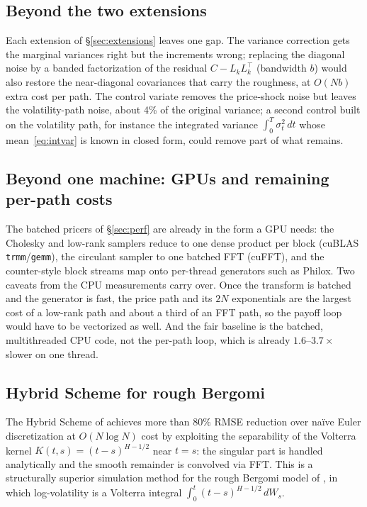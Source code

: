 \subsection{Beyond the two extensions}
\label{sec:ext-future}

Each extension of §\ref{sec:extensions} leaves one gap.  The variance correction gets
the marginal variances right but the increments wrong; replacing the diagonal noise by
a banded factorization of the residual $C - L_k L_k^\top$ (bandwidth $b$) would also
restore the near-diagonal covariances that carry the roughness, at $O(Nb)$ extra cost
per path.  The control variate removes the price-shock noise but leaves the
volatility-path noise, about 4\% of the original variance; a second control built on
the volatility path, for instance the integrated variance $\int_0^T \sigma_t^2\,dt$ whose
mean~\eqref{eq:intvar} is known in closed form, could remove part of what remains.

\subsection{Beyond one machine: GPUs and remaining per-path costs}
\label{sec:gpu-future}

The batched pricers of §\ref{sec:perf} are already in the form a GPU needs: the
Cholesky and low-rank samplers reduce to one dense product per block (cuBLAS
\texttt{trmm}/\texttt{gemm}), the circulant sampler to one batched FFT (cuFFT), and the
counter-style block streams map onto per-thread generators such as Philox.  Two caveats
from the CPU measurements carry over.  Once the transform is batched and the generator is fast, the price
path and its $2N$ exponentials are the largest cost of a low-rank path and about a third
of an FFT path, so the payoff loop would have to be vectorized as well.  And the fair
baseline is the batched, multithreaded CPU code, not the per-path loop, which is
already $1.6$--$3.7\times$ slower on one thread.

\subsection{Hybrid Scheme for rough Bergomi}
\label{sec:hybrid-future}

The Hybrid Scheme of \citet{bennedsen2017hybrid} achieves more than $80\%$
RMSE reduction over naïve Euler discretization at $O(N \log N)$ cost by
exploiting the separability of the Volterra kernel $K(t,s) = (t-s)^{H-1/2}$
near $t = s$: the singular part is handled analytically and the smooth
remainder is convolved via FFT.  This is a structurally superior simulation
method for the rough Bergomi model of \citet{bayer2016pricing}, in
which log-volatility is a Volterra integral $\int_0^t (t-s)^{H-1/2}\,dW_s$.

